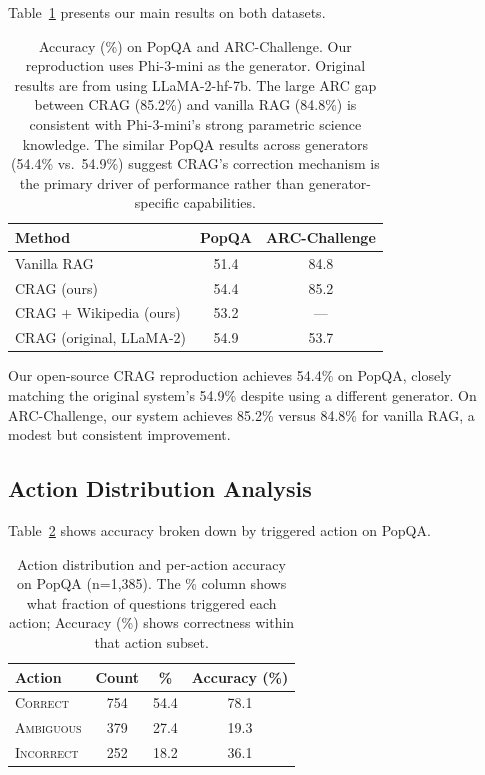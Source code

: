 \documentclass[11pt]{article}
\begin{document}
Table~\ref{tab:main_results} presents our main results on both datasets.

\begin{table}[H]
\centering
\begin{tabular}{lcc}
\toprule
\textbf{Method} & \textbf{PopQA} & \textbf{ARC-Challenge} \\
\midrule
Vanilla RAG                  & 51.4 & 84.8 \\
CRAG (ours)                  & 54.4 & 85.2 \\
CRAG + Wikipedia (ours)      & 53.2 & ---  \\
\midrule
CRAG (original, LLaMA-2)     & 54.9 & 53.7 \\
\bottomrule
\end{tabular}
\caption{Accuracy (\%) on PopQA and ARC-Challenge. Our reproduction uses Phi-3-mini as the
generator. Original results are from \cite{yan2024corrective} using LLaMA-2-hf-7b. The large ARC
gap between CRAG (85.2\%) and vanilla RAG (84.8\%) is consistent with Phi-3-mini's strong
parametric science knowledge. The similar PopQA results across generators (54.4\% vs.\ 54.9\%)
suggest CRAG's correction mechanism is the primary driver of performance rather than
generator-specific capabilities.}
\label{tab:main_results}
\end{table}

Our open-source CRAG reproduction achieves 54.4\% on PopQA, closely matching the original
system's 54.9\% despite using a different generator. On ARC-Challenge, our system achieves 85.2\%
versus 84.8\% for vanilla RAG, a modest but consistent improvement.

\subsection{Action Distribution Analysis}

Table~\ref{tab:action_results} shows accuracy broken down by triggered action on PopQA.

\begin{table}[H]
\centering
\begin{tabular}{lccc}
\toprule
\textbf{Action} & \textbf{Count} & \textbf{\%} & \textbf{Accuracy (\%)} \\
\midrule
\textsc{Correct}   & 754 & 54.4 & 78.1 \\
\textsc{Ambiguous} & 379 & 27.4 & 19.3 \\
\textsc{Incorrect} & 252 & 18.2 & 36.1 \\
\bottomrule
\end{tabular}
\caption{Action distribution and per-action accuracy on PopQA (n=1,385). The \% column shows what
fraction of questions triggered each action; Accuracy (\%) shows correctness within that action
subset.}
\label{tab:action_results}
\end{table}
\end{document}
